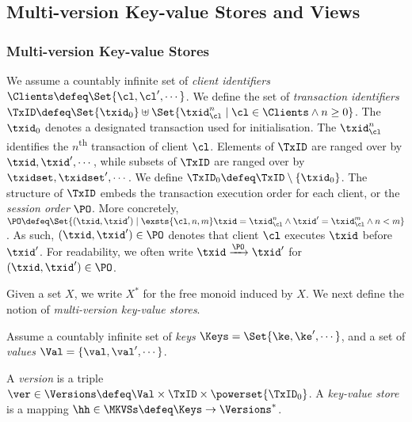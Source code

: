 \subsection{Multi-version Key-value Stores and Views}
\label{sec:mkvs-view}

\subsubsection{Multi-version Key-value Stores} 
We assume a countably infinite set of \emph{client identifiers} $\Clients \defeq \Set{\cl, \cl',\cdots}$. 
We define the set of \emph{transaction identifiers} 
$\TxID \defeq  \Set{\txid_{0}} \uplus \Set{ \txid_{\cl}^{n} \mid \cl \in \Clients \wedge n \geq 0 }$.
The $\txid_0$ denotes a designated transaction used for initialisation. 
The $\txid_{\cl}^{n}$ identifies the $n$\textsuperscript{th} transaction of client $\cl$. 
Elements of $\TxID$ are ranged over by $\txid, \txid', \cdots$, 
while subsets of $\TxID$ are ranged over by $\txidset, \txidset', \cdots$. 
We define $\TxID_{0} \defeq \TxID \setminus \{ \txid_0\}$.
The structure of $\TxID$  
embeds the transaction execution order for each client, or the \emph{session order} $\PO$. 
More concretely, 
$\PO \defeq \Set{ (\txid, \txid') \mid \exsts{ \cl, n,m } \txid = \txid_{\cl}^{n} \wedge \txid' = \txid_{\cl}^{m} \wedge n < m}$.
As such, $(\txid, \txid') \in \PO$ denotes that 
client $\cl$ executes $\txid$ before $\txid'$.
For readability, we often write  $\txid \xrightarrow{\PO} \txid'$ for $(\txid, \txid') \in \PO$.

Given a set $X$, 
we write $X^{\ast}$ for the free monoid induced by $X$.
We next define the notion of \emph{multi-version key-value stores}.


\begin{definition}
\label{def:his_heap}
\label{def:mkvs}
Assume a countably infinite set of \emph{keys} $\Keys = \Set{\ke, \ke', \cdots}$, 
and a set of \emph{values} $\Val = \{\val, \val', \cdots\}$.

A \emph{version} is a triple $\ver \in \Versions \defeq \Val \times \TxID \times \powerset{\TxID_{0}}$. 
A \emph{key-value store} is a mapping $\hh \in \MKVSs \defeq \Keys \rightarrow \Versions^{\ast}$. 
\end{definition}

